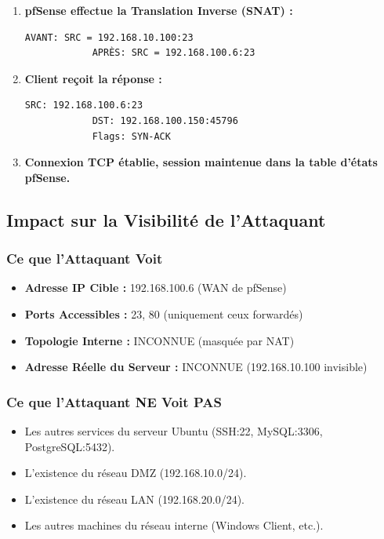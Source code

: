 \documentclass[12pt,a4paper,openany]{report}
\begin{document}
\begin{enumerate}
		\item \textbf{pfSense effectue la Translation Inverse (SNAT) :}
		\begin{lstlisting}[caption=Réécriture de la réponse]
			AVANT: SRC = 192.168.10.100:23
			APRÈS: SRC = 192.168.100.6:23
		\end{lstlisting}
		
		\item \textbf{Client reçoit la réponse :}
		\begin{lstlisting}[caption=Réponse vue par le client]
			SRC: 192.168.100.6:23
			DST: 192.168.100.150:45796
			Flags: SYN-ACK
		\end{lstlisting}
		
		\item \textbf{Connexion TCP établie, session maintenue dans la table d'états pfSense.}
	\end{enumerate}
	
	\subsection{Impact sur la Visibilité de l'Attaquant}
	\subsubsection{Ce que l'Attaquant Voit}
	\begin{itemize}
		\item \textbf{Adresse IP Cible :} 192.168.100.6 (WAN de pfSense)
		\item \textbf{Ports Accessibles :} 23, 80 (uniquement ceux forwardés)
		\item \textbf{Topologie Interne :} INCONNUE (masquée par NAT)
		\item \textbf{Adresse Réelle du Serveur :} INCONNUE (192.168.10.100 invisible)
	\end{itemize}
	
	\subsubsection{Ce que l'Attaquant NE Voit PAS}
	\begin{itemize}
		\item Les autres services du serveur Ubuntu (SSH:22, MySQL:3306, PostgreSQL:5432).
		\item L'existence du réseau DMZ (192.168.10.0/24).
		\item L'existence du réseau LAN (192.168.20.0/24).
		\item Les autres machines du réseau interne (Windows Client, etc.).
	\end{itemize}
	
\end{document}
